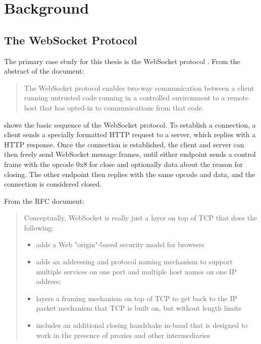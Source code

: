 \chapter{Background}
\label{chap:background}

\section{The WebSocket Protocol}
The primary case study for this thesis is the WebSocket protocol 
\cite{draft-ietf-hybi-thewebsocketprotocol}. From the abstract of the document:
\begin{quote}The WebSocket protocol enables two-way communication between a
client running untrusted code running in a controlled environment to a
remote host that has opted-in to communications from that code.
\end{quote}


 shows the basic sequence of the WebSocket protocol. To
establish a connection, a client sends a specially formatted HTTP request to a
server, which replies with a HTTP response. Once the connection is
established, the client and server can then freely send WebSocket message
frames, until either endpoint sends a control frame with the opcode 0x8 for
close and optionally data about the reason for closing. The other endpoint then
replies with the same opcode and data, and the connection is considered closed.

From the RFC document:

\begin{quote}
	Conceptually, WebSocket is really just a layer on top of TCP that
	does the following:
	\begin{itemize}
		\item adds a Web "origin"-based security model for browsers
	
		\item adds an addressing and protocol naming mechanism to support
		multiple services on one port and multiple host names on one IP
		address;
	
		\item layers a framing mechanism on top of TCP to get back to the IP
		packet mechanism that TCP is built on, but without length limits
	
		\item includes an additional closing handshake in-band that is designed
		to work in the presence of proxies and other intermediaries
	\end{itemize}
\end{quote}

